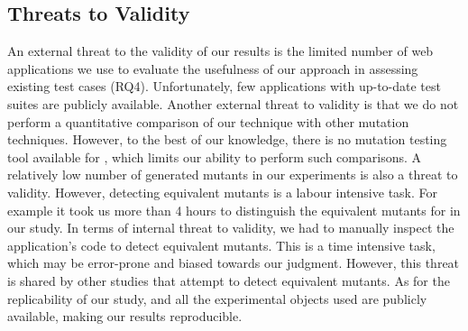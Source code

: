 \subsection{Threats to Validity} \label{threats}
An external threat to the validity of our results is the limited number 
of web applications we use to evaluate the usefulness of our approach
in assessing existing test cases (RQ4). Unfortunately, few \javascript applications with up-to-date test suites are publicly available.
Another external threat to validity is that we do not perform a quantitative comparison 
of our technique with other mutation techniques. However, to the
best of our knowledge, there is no mutation testing tool available for \javascript, 
which limits our ability to perform such comparisons.
A relatively low number of generated mutants in our experiments is also a threat to validity. However, detecting equivalent mutants is a labour intensive task. For example it took us more than 4 hours to distinguish the equivalent mutants for \jquery in our study.  
In terms of internal threat to validity, we had to manually inspect the 
application's code to detect equivalent mutants. This is a time intensive task, which may be error-prone and biased towards our judgment. However, this threat is shared by other studies that attempt to detect equivalent mutants. As for the replicability of our study, \mutandis and all the experimental objects used are publicly available, making our results  reproducible. 
